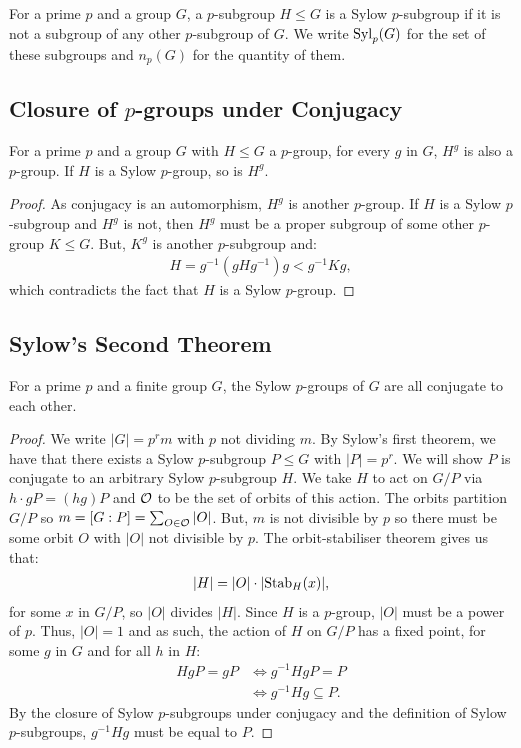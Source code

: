 For a prime $p$ and a group $G$, a $p$-subgroup $H \leq G$
is a Sylow $p$-subgroup if it is not a subgroup of any other
$p$-subgroup of $G$. We write $\operatorname{Syl}_p(G)$ for the set of
these subgroups and $n_p(G)$ for the quantity of them.

\subsection{Closure of $p$-groups under Conjugacy}

For a prime $p$ and a group $G$ with $H \leq G$ a $p$-group,
for every $g$ in $G$, $H^g$ is also a $p$-group.
If $H$ is a Sylow $p$-group, so is $H^g$. 

\begin{proof}
    As conjugacy is an automorphism, $H^g$ is another $p$-group.
    If $H$ is a Sylow $p$-subgroup and $H^g$ is not, then $H^g$ 
    must be a proper subgroup of some other $p$-group $K \leq G$.
    But, $K^g$ is another $p$-subgroup and: \begin{align*}
        H = g^{-1}(gHg^{-1})g < g^{-1}Kg,
    \end{align*} which contradicts the fact that $H$ is a
    Sylow $p$-group.
\end{proof}

\subsection{Sylow's Second Theorem}

For a prime $p$ and a finite group $G$, the Sylow $p$-groups
of $G$ are all conjugate to each other.

\begin{proof}
    We write $|G| = p^rm$ with $p$ not dividing $m$.
    By Sylow's first theorem, we have that there exists
    a Sylow $p$-subgroup $P \leq G$ with $|P| = p^r$.
    We will show $P$ is conjugate to an arbitrary Sylow
    $p$-subgroup $H$.
    We take $H$ to act on $G / P$ via $h \cdot gP = (hg)P$
    and $\mathcal{O}$ to be the set of orbits of this action.
    The orbits partition $G / P$ so 
    $m = [G : P] = \sum_{O \in \mathcal{O}} |O|$. But, $m$
    is not divisible by $p$ so there must be some orbit
    $O$ with $|O|$ not divisible by $p$.
    The orbit-stabiliser theorem gives us that: \begin{align*}
        |H| = |O| \cdot |\!\operatorname{Stab}_H(x)|,
    \end{align*} for some $x$ in $G / P$, so $|O|$ divides
    $|H|$. Since $H$ is a $p$-group, $|O|$ must be a power
    of $p$. Thus, $|O| = 1$ and as such, the action of $H$ on 
    $G / P$ has a fixed point, for some $g$ in $G$ and for 
    all $h$ in $H$: \begin{align*}
        HgP = gP
        & \Longleftrightarrow g^{-1}HgP = P \\
        & \Longleftrightarrow g^{-1}Hg \subseteq P.
    \end{align*} By the closure of Sylow $p$-subgroups under
    conjugacy and the definition of Sylow $p$-subgroups, 
    $g^{-1}Hg$ must be equal to $P$.
\end{proof}

